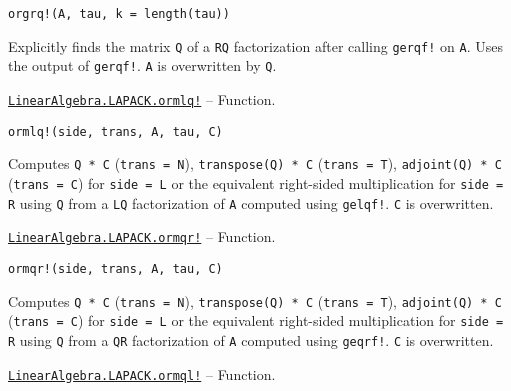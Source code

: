 \begin{adjustwidth}{2em}{0pt}


\begin{verbatim}
orgrq!(A, tau, k = length(tau))
\end{verbatim}

Explicitly finds the matrix \texttt{Q} of a \texttt{RQ} factorization after calling \texttt{gerqf!} on \texttt{A}. Uses the output of \texttt{gerqf!}. \texttt{A} is overwritten by \texttt{Q}.



\end{adjustwidth}
\hypertarget{6791415432360539771}{}
\hyperlink{6791415432360539771}{\texttt{LinearAlgebra.LAPACK.ormlq!}}  -- {Function.}

\begin{adjustwidth}{2em}{0pt}


\begin{verbatim}
ormlq!(side, trans, A, tau, C)
\end{verbatim}

Computes \texttt{Q * C} (\texttt{trans = N}), \texttt{transpose(Q) * C} (\texttt{trans = T}), \texttt{adjoint(Q) * C} (\texttt{trans = C}) for \texttt{side = L} or the equivalent right-sided multiplication for \texttt{side = R} using \texttt{Q} from a \texttt{LQ} factorization of \texttt{A} computed using \texttt{gelqf!}. \texttt{C} is overwritten.



\end{adjustwidth}
\hypertarget{4642443581739897648}{}
\hyperlink{4642443581739897648}{\texttt{LinearAlgebra.LAPACK.ormqr!}}  -- {Function.}

\begin{adjustwidth}{2em}{0pt}


\begin{verbatim}
ormqr!(side, trans, A, tau, C)
\end{verbatim}

Computes \texttt{Q * C} (\texttt{trans = N}), \texttt{transpose(Q) * C} (\texttt{trans = T}), \texttt{adjoint(Q) * C} (\texttt{trans = C}) for \texttt{side = L} or the equivalent right-sided multiplication for \texttt{side = R} using \texttt{Q} from a \texttt{QR} factorization of \texttt{A} computed using \texttt{geqrf!}. \texttt{C} is overwritten.



\end{adjustwidth}
\hypertarget{8769001276299575898}{}
\hyperlink{8769001276299575898}{\texttt{LinearAlgebra.LAPACK.ormql!}}  -- {Function.}

